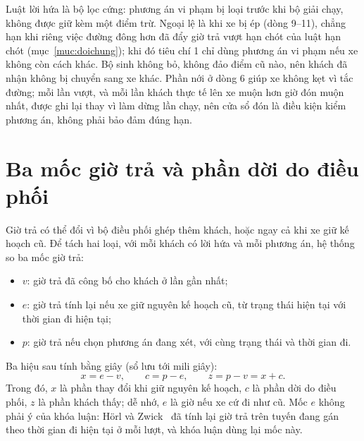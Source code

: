 
Luật lời hứa là bộ lọc cứng: phương án vi phạm bị loại trước khi bộ giải chạy, không được giữ kèm một điểm trừ.
Ngoại lệ là khi xe bị ép (dòng 9--11), chẳng hạn khi riêng việc đường đông hơn đã đẩy giờ trả vượt hạn chót của
luật hạn chót (mục~\ref{muc:doichung}); khi đó tiêu chí 1 chỉ dùng phương án vi phạm nếu xe không còn cách khác.
Bộ sinh không bỏ, không đảo điểm cũ nào, nên khách đã nhận không bị chuyển sang xe khác. Phần nới ở dòng 6 giúp
xe không kẹt vì tắc đường; mỗi lần vượt, và mỗi lần khách thực tế lên xe muộn hơn giờ đón muộn nhất, được ghi lại
thay vì làm dừng lần chạy, nên cửa sổ đón là điều kiện kiểm phương án, không phải bảo đảm đúng hạn.

\section{Ba mốc giờ trả và phần dời do điều phối}
\label{muc:bamoc}

Giờ trả có thể đổi vì bộ điều phối ghép thêm khách, hoặc ngay cả khi xe giữ kế hoạch cũ. Để tách hai loại, với
mỗi khách có lời hứa và mỗi phương án, hệ thống so ba mốc giờ trả:
\begin{itemize}[leftmargin=1.2cm,itemsep=2pt,topsep=3pt]
\item $v$: giờ trả đã công bố cho khách ở lần gần nhất;
\item $e$: giờ trả tính lại nếu xe giữ nguyên kế hoạch cũ, từ trạng thái hiện tại với thời gian đi hiện tại;
\item $p$: giờ trả nếu chọn phương án đang xét, với cùng trạng thái và thời gian đi.
\end{itemize}
Ba hiệu sau tính bằng giây (sổ lưu tới mili giây):
\begin{equation}
x = e - v, \qquad c = p - e, \qquad z = p - v = x + c .
\label{eq:bamoc}
\end{equation}
Trong đó, $x$ là phần thay đổi khi giữ nguyên kế hoạch, $c$ là phần dời do điều phối, $z$ là phần khách thấy;
dễ nhớ, $e$ là giờ nếu xe cứ đi như cũ. Mốc $e$ không phải ý của khóa luận: Hörl và Zwick~\cite{horl2022} đã tính
lại giờ trả trên tuyến đang gán theo thời gian đi hiện tại ở mỗi lượt, và khóa luận dùng lại mốc này.

